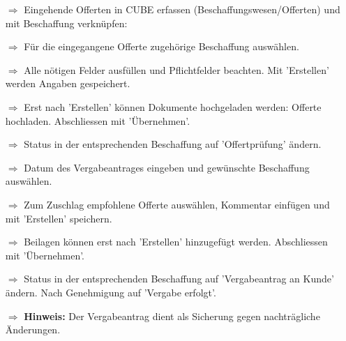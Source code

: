 \documentclass{article}
\begin{document}

\begin{multicols}{2}

\begin{tcolorbox}[colback=blue!5,colframe=blue!40!black,title=(3) Offerte(n) entgegennehmen und prüfen]
\begin{itemize}
  \item[$\Longrightarrow$] Eingehende Offerten in CUBE erfassen (Beschaffungswesen/Offerten) und mit Beschaffung verknüpfen:
	\item[$\Longrightarrow$] Für die eingegangene Offerte zugehörige Beschaffung auswählen.
  \item[$\Longrightarrow$] Alle nötigen Felder ausfüllen und Pflichtfelder beachten. Mit 'Erstellen' werden Angaben gespeichert.
	\item[$\Longrightarrow$] Erst nach 'Erstellen' können Dokumente hochgeladen werden: Offerte hochladen. Abschliessen mit 'Übernehmen'.
	\item[$\Longrightarrow$] Status in der entsprechenden Beschaffung auf 'Offertprüfung' ändern.
\end{itemize}
\end{tcolorbox}


\begin{tcolorbox}[colback=blue!5,colframe=blue!40!black,title=(4) Vergabeantrag ausfüllen]
\begin{itemize}
  \item[$\Longrightarrow$] Datum des Vergabeantrages eingeben und gewünschte Beschaffung auswählen.
  \item[$\Longrightarrow$] Zum Zuschlag empfohlene Offerte auswählen, Kommentar einfügen und mit 'Erstellen' speichern.
  \item[$\Longrightarrow$] Beilagen können erst nach 'Erstellen' hinzugefügt werden. Abschliessen mit 'Übernehmen'.
	\item[$\Longrightarrow$] Status in der entsprechenden Beschaffung auf 'Vergabeantrag an Kunde' ändern. Nach Genehmigung auf 'Vergabe erfolgt'.
	\item[$\Longrightarrow$] \textbf{Hinweis:} Der Vergabeantrag dient als Sicherung gegen nachträgliche Änderungen.
\end{itemize}
\end{tcolorbox}


\end{multicols}

\end{document}
